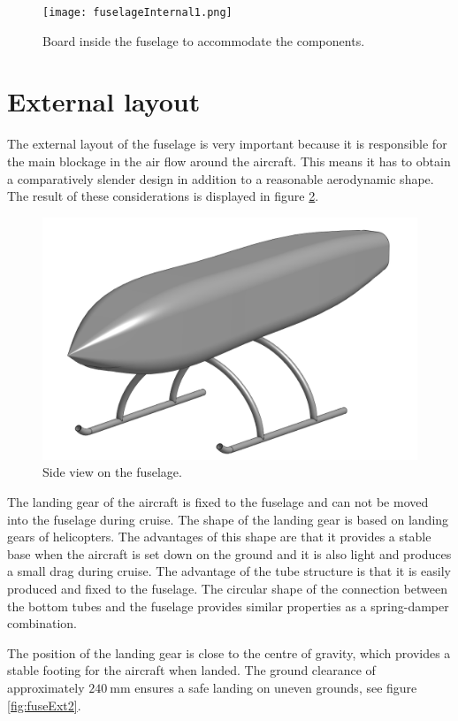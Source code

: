 \documentclass[english,fira]{ist-report}
\begin{document}
\begin{figure}[ht]
	\centering
	\texttt{[image: fuselageInternal1.png]}
	\caption{Board inside the fuselage to accommodate the components.}
	\label{fig:fuseInt1}
\end{figure}

\section{External layout}

The external layout of the fuselage is very important because it is responsible for the main blockage in the air flow around the aircraft. This means it has to obtain a comparatively slender design in addition to a reasonable aerodynamic shape. The result of these considerations is displayed in figure \ref{fig:fuseExt1}.

\begin{figure}[ht]
	\centering
	\includegraphics[width = 0.95\linewidth]{graphics/fuselageExternal1.png}
	\caption{Side view on the fuselage.}
	\label{fig:fuseExt1}
\end{figure}

The landing gear of the aircraft is fixed to the fuselage and can not be moved into the fuselage during cruise. The shape of the landing gear is based on landing gears of helicopters. The advantages of this shape are that it provides a stable base when the aircraft is set down on the ground and it is also light and produces a small drag during cruise. The advantage of the tube structure is that it is easily produced and fixed to the fuselage. The circular shape of the connection between the bottom tubes and the fuselage provides similar properties as a spring-damper combination.

The position of the landing gear is close to the centre of gravity, which provides a stable footing for the aircraft when landed. The ground clearance of approximately $240\ \mathrm{mm}$ ensures a safe landing on uneven grounds, see figure \ref{fig:fuseExt2}.
\end{document}

